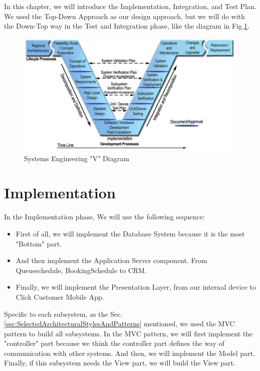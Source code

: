 \documentclass[a4paper,12pt]{report}
\begin{document}
In this chapter, we will introduce the Implementation, Integration, and Test Plan.
We used the Top-Down Approach as our design approach, but we will do with the Down-Top way in the Test and Integration phase,
like the diagram in Fig.\ref{fig:SystemsEngineeringVDiagram}. \cite{SystemsEngineeringforIntelligentTransportationSystems}

\begin{figure}[H]
	\includegraphics[width=\textwidth]{SystemsEngineeringVDiagram}
	\centering
	\caption{Systems Engineering "V" Diagram}
	\label{fig:SystemsEngineeringVDiagram}
\end{figure}


\section{Implementation}\label{sec:Implementation}

In the Implementation phase, We will use the following sequence:
\begin{itemize}
	\item First of all, we will implement the Database System because it is the most "Bottom" part.
	\item And then implement the Application Server component. From Queueschedule, BookingSchedule to CRM.
	\item Finally, we will implement the Presentation Layer, from our internal device to Click Customer Mobile App.
\end{itemize}

Specific to each subsystem, as the Sec.\ref{sec:SelectedArchitecturalStylesAndPatterns} mentioned, we used the MVC pattern to build all subsystems.
In the MVC pattern, we will first implement the "controller" part because we think the controller part defines the way of communication with other systems.
And then, we will implement the Model part.
Finally, if this subsystem needs the View part, we will build the View part.
\end{document}
